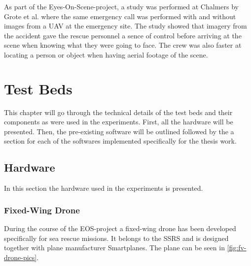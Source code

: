 \documentclass[nofilelist]{cslthse-msc}
\begin{document}
As part of the Eyes-On-Scene-project, a study was performed at Chalmers by Grote et al. \cite{eos-maritime} where the same emergency call was performed with and without images from a UAV at the emergency site. The study showed that imagery from the accident gave the rescue personnel a sence of control before arriving at the scene when knowing what they were going to face. The crew was also faster at locating a person or object when having aerial footage of the scene.

\chapter{Test Beds}
This chapter will go through the technical details of the test beds and their components as were used in the experiments. First, all the hardware will be presented. Then, the pre-existing software will be outlined followed by the a section for each of the softwares implemented specifically for the thesis work.

\section{Hardware}
In this section the hardware used in the experiments is presented.

\subsection{Fixed-Wing Drone}
During the course of the EOS-project a fixed-wing drone has been developed specifically for sea rescue missions. It belongs to the SSRS and is designed together with plane manufacturer Smartplanes. The plane can be seen in \ref{fig:fv-drone-pics}.
\end{document}
